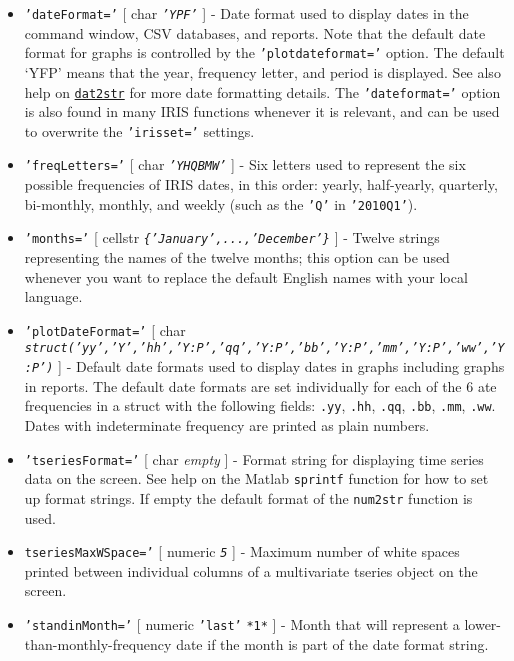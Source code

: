  \begin{itemize}
 \item
   \texttt{'dateFormat='} {[} char \textbar{} \emph{\texttt{'YPF'}} {]} -
   Date format used to display dates in the command window, CSV
   databases, and reports. Note that the default date format for graphs
   is controlled by the \texttt{'plotdateformat='} option. The default
   `YFP' means that the year, frequency letter, and period is displayed.
   See also help on \href{dates/dat2str}{\texttt{dat2str}} for more date
   formatting details. The \texttt{'dateformat='} option is also found in
   many IRIS functions whenever it is relevant, and can be used to
   overwrite the \texttt{'irisset='} settings.
 \item
   \texttt{'freqLetters='} {[} char \textbar{} \emph{\texttt{'YHQBMW'}}
   {]} - Six letters used to represent the six possible frequencies of
   IRIS dates, in this order: yearly, half-yearly, quarterly, bi-monthly,
   monthly, and weekly (such as the \texttt{'Q'} in \texttt{'2010Q1'}).
 \item
   \texttt{'months='} {[} cellstr \textbar{}
   \emph{\texttt{\{'January',...,'December'\}}} {]} - Twelve strings
   representing the names of the twelve months; this option can be used
   whenever you want to replace the default English names with your local
   language.
 \item
   \texttt{'plotDateFormat='} {[} char \textbar{}
   \emph{\texttt{struct('yy','Y','hh','Y:P','qq','Y:P','bb','Y:P','mm','Y:P','ww','Y:P')}}
   {]} - Default date formats used to display dates in graphs including
   graphs in reports. The default date formats are set individually for
   each of the 6 ate frequencies in a struct with the following fields:
   \texttt{.yy}, \texttt{.hh}, \texttt{.qq}, \texttt{.bb}, \texttt{.mm},
   \texttt{.ww}. Dates with indeterminate frequency are printed as plain
   numbers.
 \item
   \texttt{'tseriesFormat='} {[} char \textbar{} \emph{empty} {]} -
   Format string for displaying time series data on the screen. See help
   on the Matlab \texttt{sprintf} function for how to set up format
   strings. If empty the default format of the \texttt{num2str} function
   is used.
 \item
   \texttt{tseriesMaxWSpace='} {[} numeric \textbar{} \emph{\texttt{5}}
   {]} - Maximum number of white spaces printed between individual
   columns of a multivariate tseries object on the screen.
 \item
   \texttt{'standinMonth='} {[} numeric \textbar{} \texttt{'last'}
   \textbar{} \texttt{*1*} {]} - Month that will represent a
   lower-than-monthly-frequency date if the month is part of the date
   format string.
 \end{itemize}
 
